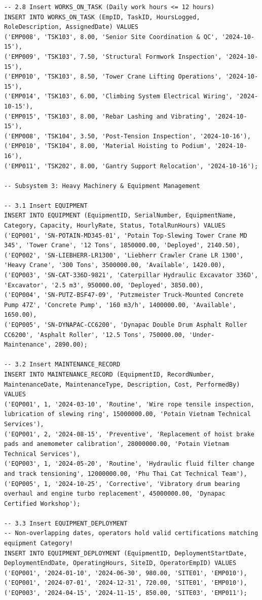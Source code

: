 \documentclass[a4paper,12pt]{report}
\begin{document}
\begin{lstlisting}
-- 2.8 Insert WORKS_ON_TASK (Daily work hours <= 12 hours)
INSERT INTO WORKS_ON_TASK (EmpID, TaskID, HoursLogged, RoleDescription, AssignedDate) VALUES
('EMP008', 'TSK103', 8.00, 'Senior Site Coordination & QC', '2024-10-15'),
('EMP009', 'TSK103', 7.50, 'Structural Formwork Inspection', '2024-10-15'),
('EMP010', 'TSK103', 8.50, 'Tower Crane Lifting Operations', '2024-10-15'),
('EMP014', 'TSK103', 6.00, 'Climbing System Electrical Wiring', '2024-10-15'),
('EMP015', 'TSK103', 8.00, 'Rebar Lashing and Vibrating', '2024-10-15'),
('EMP008', 'TSK104', 3.50, 'Post-Tension Inspection', '2024-10-16'),
('EMP010', 'TSK104', 8.00, 'Material Hoisting to Podium', '2024-10-16'),
('EMP011', 'TSK202', 8.00, 'Gantry Support Relocation', '2024-10-16');

-- Subsystem 3: Heavy Machinery & Equipment Management

-- 3.1 Insert EQUIPMENT
INSERT INTO EQUIPMENT (EquipmentID, SerialNumber, EquipmentName, Category, Capacity, HourlyRate, Status, TotalRunHours) VALUES
('EQP001', 'SN-POTAIN-MD345-01', 'Potain Top-Slewing Tower Crane MD 345', 'Tower Crane', '12 Tons', 1850000.00, 'Deployed', 2140.50),
('EQP002', 'SN-LIEBHERR-LR1300', 'Liebherr Crawler Crane LR 1300', 'Heavy Crane', '300 Tons', 3500000.00, 'Available', 1420.00),
('EQP003', 'SN-CAT-336D-9821', 'Caterpillar Hydraulic Excavator 336D', 'Excavator', '2.5 m3', 950000.00, 'Deployed', 3850.00),
('EQP004', 'SN-PUTZ-BSF47-09', 'Putzmeister Truck-Mounted Concrete Pump 47Z', 'Concrete Pump', '160 m3/h', 1400000.00, 'Available', 1650.00),
('EQP005', 'SN-DYNAPAC-CC6200', 'Dynapac Double Drum Asphalt Roller CC6200', 'Asphalt Roller', '12.5 Tons', 750000.00, 'Under-Maintenance', 2890.00);

-- 3.2 Insert MAINTENANCE_RECORD
INSERT INTO MAINTENANCE_RECORD (EquipmentID, RecordNumber, MaintenanceDate, MaintenanceType, Description, Cost, PerformedBy) VALUES
('EQP001', 1, '2024-03-10', 'Routine', 'Wire rope tensile inspection, lubrication of slewing ring', 15000000.00, 'Potain Vietnam Technical Services'),
('EQP001', 2, '2024-08-15', 'Preventive', 'Replacement of hoist brake pads and anemometer calibration', 28000000.00, 'Potain Vietnam Technical Services'),
('EQP003', 1, '2024-05-20', 'Routine', 'Hydraulic fluid filter change and track tensioning', 12000000.00, 'Phu Thai Cat Technical Team'),
('EQP005', 1, '2024-10-25', 'Corrective', 'Vibratory drum bearing overhaul and engine turbo replacement', 45000000.00, 'Dynapac Certified Workshop');

-- 3.3 Insert EQUIPMENT_DEPLOYMENT
-- Non-overlapping dates, operators hold valid certifications matching equipment Category!
INSERT INTO EQUIPMENT_DEPLOYMENT (EquipmentID, DeploymentStartDate, DeploymentEndDate, OperatingHours, SiteID, OperatorEmpID) VALUES
('EQP001', '2024-01-10', '2024-06-30', 980.00, 'SITE01', 'EMP010'),
('EQP001', '2024-07-01', '2024-12-31', 720.00, 'SITE01', 'EMP010'),
('EQP003', '2024-04-15', '2024-11-15', 850.00, 'SITE03', 'EMP011');


\end{lstlisting}
\end{document}
